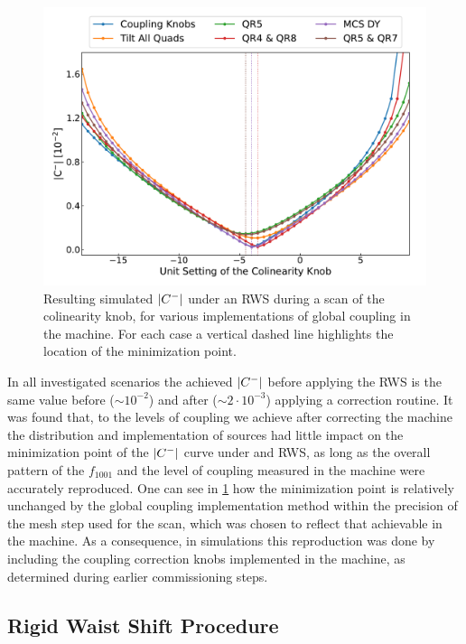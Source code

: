 \begin{figure}[!hbt]
    \centering
    \includegraphics*[width=\textwidth]{Figures/IR_Coupling_Correction/global_sources_influence.pdf}
    \caption{Resulting simulated \(\left\lvert C^{-} \right\rvert\) under an RWS during a scan of the colinearity knob, for various implementations of global coupling in the machine. For each case a vertical dashed line highlights the location of the minimization point.}
    \label{figure:global_coupling_modeling_impact}
\end{figure}

In all investigated scenarios the achieved \(\left\lvert C^{-} \right\rvert\) before applying the RWS is the same value before (\(\sim 10^{-2}\)) and after (\(\sim 2 \cdot 10^{-3}\)) applying a correction routine.
It was found that, to the levels of coupling we achieve after correcting the machine the distribution and implementation of sources had little impact on the minimization point of the \(\left\lvert C^{-} \right\rvert\) curve under and RWS, as long as the overall pattern of the \(f_{1001}\) and the level of coupling measured in the machine were accurately reproduced.
One can see in \cref{figure:global_coupling_modeling_impact} how the minimization point is relatively unchanged by the global coupling implementation method within the precision of the mesh step used for the scan, which was chosen to reflect that achievable in the machine.
As a consequence, in simulations this reproduction was done by including the coupling correction knobs implemented in the machine, as determined during earlier commissioning steps.

\subsection{Rigid Waist Shift Procedure}

